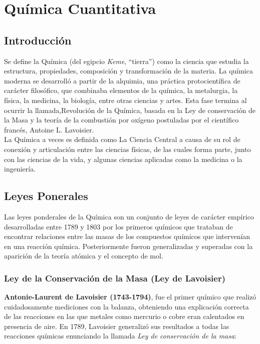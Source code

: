 
\chapter{Química Cuantitativa}

\section{Introducción}
Se define la Química (del egipcio \emph{Keme}, “tierra”) como la ciencia que estudia la estructura, propiedades, composición y transformación de la materia. La química moderna se desarrolló a partir de la alquimia, una práctica protocientífica de carácter filosófico, que combinaba elementos de la química, la metalurgia, la física, la medicina, la biología, entre otras ciencias y artes. Esta fase termina al ocurrir la llamada,Revolución de la Química, basada en la Ley de conservación de la Masa y la teoría de la combustión por oxígeno postuladas por el científico francés, Antoine L. Lavoisier. \\
La Química a veces es definida como La Ciencia Central a causa de su rol de conexión y articulación entre las ciencias físicas, de las cuales forma parte, junto con las ciencias de la vida, y algunas ciencias aplicadas como la medicina o la ingeniería.

\section{Leyes Ponerales}

Las leyes ponderales de la Química son un conjunto de leyes de carácter empírico desarrolladas entre 1789 y 1803 por los primeros químicos que trataban de encontrar relaciones entre las masas de los compuestos químicos que intervenían en una reacción química. Posteriormente fueron generalizadas y superadas con la aparición de la teoría atómica y el concepto de mol.

\subsection{Ley de la Conservación de la Masa (Ley de Lavoisier)}

\textbf{Antonie-Laurent de Lavoisier (1743-1794)}, fue el primer químico que realizó cuidadosamente mediciones con la balanza, obteniendo una explicación correcta de las reacciones en las que metales como mercurio o cobre eran calentados en presencia de aire. En 1789, Lavoisier generalizó sus resultados a todas las reacciones químicas enunciando la llamada \emph{Ley de conservación de la masa}:\\


